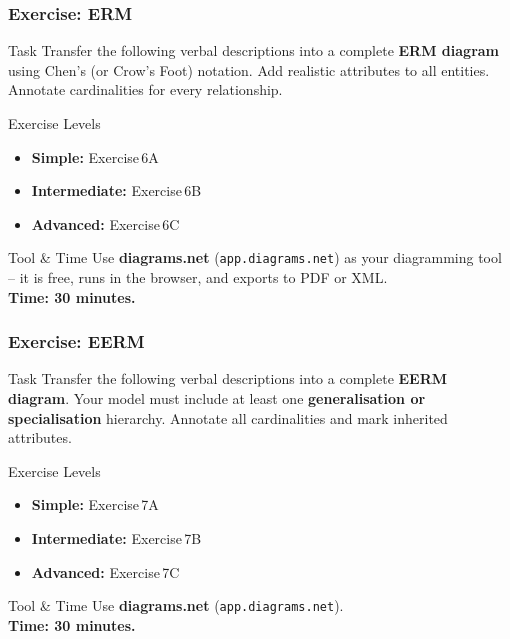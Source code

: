 \begin{frame}
  \frametitle{Exercise: ERM}

  \begin{block}{Task}
    Transfer the following verbal descriptions into a complete \textbf{ERM diagram} using Chen's (or Crow's Foot) notation. Add realistic attributes to all entities. Annotate cardinalities for every relationship.
  \end{block}

  \begin{block}{Exercise Levels}
    \begin{itemize}
      \item \textbf{Simple:} Exercise\,6A
      \item \textbf{Intermediate:} Exercise\,6B
      \item \textbf{Advanced:} Exercise\,6C
    \end{itemize}
  \end{block}

  \begin{examples}{Tool \& Time}
    Use \textbf{diagrams.net} (\texttt{app.diagrams.net}) as your diagramming tool -- it is free, runs in the browser, and exports to PDF or XML.\\[0.3em]
    \textbf{Time: 30 minutes.}
  \end{examples}
\end{frame}

\begin{frame}
  \frametitle{Exercise: EERM}

  \begin{block}{Task}
    Transfer the following verbal descriptions into a complete \textbf{EERM diagram}. Your model must include at least one \textbf{generalisation or specialisation} hierarchy. Annotate all cardinalities and mark inherited attributes.
  \end{block}

  \begin{block}{Exercise Levels}
    \begin{itemize}
      \item \textbf{Simple:} Exercise\,7A
      \item \textbf{Intermediate:} Exercise\,7B
      \item \textbf{Advanced:} Exercise\,7C
    \end{itemize}
  \end{block}

  \begin{examples}{Tool \& Time}
    Use \textbf{diagrams.net} (\texttt{app.diagrams.net}).\\[0.3em]
    \textbf{Time: 30 minutes.}
  \end{examples}
\end{frame}

